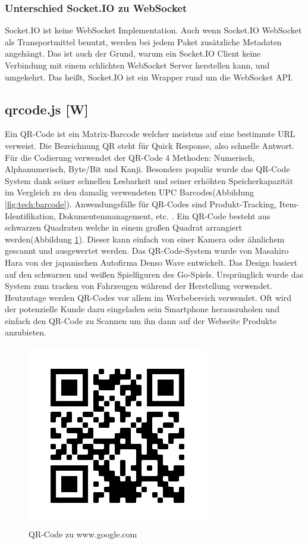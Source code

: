 \subsubsection{Unterschied Socket.IO zu WebSocket}
Socket.IO ist keine WebSocket Implementation. Auch wenn Socket.IO WebSocket als Transportmittel benutzt, werden bei jedem Paket zusätzliche Metadaten angehängt. Das ist auch der Grund, warum
ein Socket.IO Client keine Verbindung mit einem schlichten WebSocket Server herstellen kann, und umgekehrt.
Das heißt, Socket.IO ist ein Wrapper rund um die WebSocket API. \cite{socketio}


\subsection{qrcode.js [W]}
Ein QR-Code ist ein Matrix-Barcode welcher meistens auf eine bestimmte URL verweist. Die Bezeichnung QR steht für Quick Response,
also schnelle Antwort. Für die Codierung verwendet der QR-Code 4 Methoden: Numerisch, Alphanumerisch, Byte/Bit und Kanji.
Besonders populär wurde das QR-Code System dank seiner
schnellen Lesbarkeit und seiner erhöhten Speicherkapazität im Vergleich zu den
damalig verwendeten UPC Barcodes(Abbildung \ref{fig:tech:barcode}). Anwendungsfälle für QR-Codes sind Produkt-Tracking, Item-Identifikation, Dokumentenmanagement, etc. .
Ein QR-Code besteht aus schwarzen Quadraten welche in einem großen Quadrat arrangiert werden(Abbildung \ref{fig:tech:qrCode}).
Dieser kann einfach von einer Kamera oder ähnlichem gescannt und ausgewertet werden.
Das QR-Code-System wurde von Masahiro Hara von der japanischen Autofirma Denso Wave entwickelt.
Das Design basiert auf den schwarzen und weißen Spielfiguren des Go-Spiels.
Ursprünglich wurde das System zum tracken von Fahrzeugen während der Herstellung verwendet.
Heutzutage werden QR-Codes vor allem im Werbebereich verwendet. Oft wird der
potenzielle Kunde dazu eingeladen  sein Smartphone herauszuholen und einfach den QR-Code zu Scannen um
ihn dann auf der Webseite Produkte anzubieten.

\begin{figure}[H]
    \centering
    \includegraphics[scale=1]{pics/googleQR.png}
    \caption{QR-Code zu www.google.com}
    \label{fig:tech:qrCode}
\end{figure}

